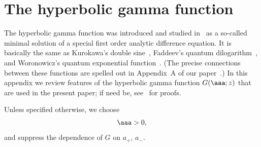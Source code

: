 \appendix


																																												 
\section{The hyperbolic gamma function}\label{appendixA}

The  hyperbolic gamma function was introduced and studied in~\cite{fo} as a so-called minimal solution of a special f\/irst order analytic dif\/ference equation. It is basically the same as Kurokawa's double sine~\cite{kuro}, Faddeev's quantum dilogarithm~\cite{fadd2}, and Woronowicz's quantum exponential function~\cite{woro}. (The precise connections between these functions are spelled out in Appendix~A of our paper~\cite{Hels}.) In this appendix we review features of the hyperbolic gamma function $G(\aaa;z)$ that are used in the present paper; if need be, see~\cite{fo} for proofs.

Unless specif\/ied otherwise, we choose
\begin{gather}
\aaa >0,
\end{gather}
and suppress the dependence of $G$ on $a_+$, $a_-$.

